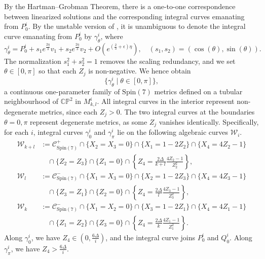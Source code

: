 \documentclass[11pt,letterpaper]{amsart}
\theoremstyle{definition}
\numberwithin{equation}{section}
\newcommand{\spin}{\mathrm{Spin}}
\begin{document}
By the Hartman--Grobman Theorem, there is a one-to-one correspondence between linearized solutions and the corresponding integral curves emanating from $P_0^i$. By the unstable version of \cite[Theorem 4.5]{coddington_theory_1955}, it is unambiguous to denote the integral curve emanating from $P_0^{i}$ by $\gamma^{i}_{\theta}$, where
\begin{equation}
\label{eqn_linearized solution}
\gamma^{i}_{\theta}=P_0^{i}+s_1 e^{\frac{2\eta}{3}}v_1+s_2 e^{\frac{2\eta}{3}}v_2+O(e^{\left(\frac{2}{3}+\epsilon\right)\eta}),\quad  (s_1,s_2)=(\cos(\theta),\sin(\theta)).
\end{equation}
The normalization $s_1^2+s_2^2=1$ removes the scaling redundancy, and we set $\theta\in [0,\pi]$ so that each $Z_j$ is non-negative. We hence obtain 
$$\{\gamma^{i}_{\theta}\mid \theta\in[0,\pi]\},$$
a continuous one-parameter family of $\spin(7)$ metrics defined on a tubular neighbourhood of $\mathbb{CP}^2$ in $M_{k,l}^i$. 
All integral curves in the interior represent non-degenerate metrics, since each $Z_j>0$.
The two integral curves at the boundaries $\theta=0,\pi$ represent degenerate metrics, as some $Z_j$ vanishes identically. Specifically, for each $i$, integral curves $\gamma^i_0$ and $\gamma^i_{\pi}$ lie on the following algebraic curves $\mathcal{W}_i$. 
\begin{equation}
\label{eqn_W curve}
\begin{split}
\mathcal{W}_{k+l}&:=\mathcal{C}_{\spin(7)}^+\cap \{X_2=X_3=0\}\cap \{X_1=1-2Z_2\}\cap \{X_4=4Z_2-1\}\\
&\quad \cap \{Z_2=Z_3\}\cap \{Z_1=0\}\cap \left\{Z_4=\frac{2\Delta}{k+l} \frac{4Z_2-1}{Z_2^2}\right\},\\
\mathcal{W}_l&:=\mathcal{C}_{\spin(7)}^-\cap \{X_1=X_3=0\}\cap \{X_2=1-2Z_3\}\cap \{X_4=4Z_3-1\}\\
&\quad \cap \{Z_3=Z_1\}\cap \{Z_2=0\}\cap \left\{Z_4=\frac{2\Delta}{l} \frac{4Z_3-1}{Z_3^2}\right\},\\
\mathcal{W}_k&:=\mathcal{C}_{\spin(7)}^-\cap \{X_1=X_2=0\}\cap \{X_3=1-2Z_1\}\cap \{X_4=4Z_1-1\}\\
&\quad \cap \{Z_1=Z_2\}\cap \{Z_3=0\}\cap \left\{Z_4=\frac{2\Delta}{k} \frac{4Z_1-1}{Z_1^2}\right\}.
\end{split}
\end{equation}
Along $\gamma_0^i$, we have $Z_4\in (0,\frac{6\Delta}{i})$, and the integral curve joins $P_0^i$ and $Q_0^i$. Along $\gamma_\pi^i$, we have $Z_4>\frac{6\Delta}{i}$.
\end{document}
